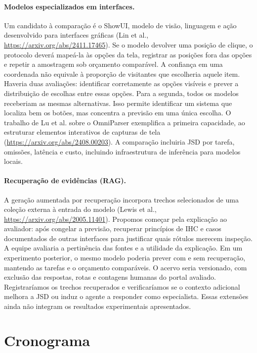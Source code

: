 \documentclass[12pt]{article}
\begin{document}
\paragraph{Modelos especializados em interfaces.} Um candidato à comparação é o ShowUI, modelo de visão, linguagem e ação desenvolvido para interfaces gráficas (Lin et al., \url{https://arxiv.org/abs/2411.17465}). Se o modelo devolver uma posição de clique, o protocolo deverá mapeá-la às opções da tela, registrar as posições fora das opções e repetir a amostragem sob orçamento comparável. A confiança em uma coordenada não equivale à proporção de visitantes que escolheria aquele item. Haveria duas avaliações: identificar corretamente as opções visíveis e prever a distribuição de escolhas entre essas opções. Para a segunda, todos os modelos receberiam as mesmas alternativas. Isso permite identificar um sistema que localiza bem os botões, mas concentra a previsão em uma única escolha. O trabalho de Lu et al. sobre o OmniParser exemplifica a primeira capacidade, ao estruturar elementos interativos de capturas de tela (\url{https://arxiv.org/abs/2408.00203}). A comparação incluiria JSD por tarefa, omissões, latência e custo, incluindo infraestrutura de inferência para modelos locais.

\paragraph{Recuperação de evidências (RAG).} A geração aumentada por recuperação incorpora trechos selecionados de uma coleção externa à entrada do modelo (Lewis et al., \url{https://arxiv.org/abs/2005.11401}). Propomos começar pela explicação ao avaliador: após congelar a previsão, recuperar princípios de IHC e casos documentados de outras interfaces para justificar quais rótulos merecem inspeção. A equipe avaliaria a pertinência das fontes e a utilidade da explicação. Em um experimento posterior, o mesmo modelo poderia prever com e sem recuperação, mantendo as tarefas e o orçamento comparáveis. O acervo seria versionado, com exclusão das respostas, rotas e contagens humanas do portal avaliado. Registraríamos os trechos recuperados e verificaríamos se o contexto adicional melhora a JSD ou induz o agente a responder como especialista. Essas extensões ainda não integram os resultados experimentais apresentados.

\section{Cronograma}
\label{sec:cronograma}
\end{document}
